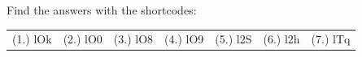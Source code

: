      

    
  \label{m38727**end}
          
       
    
  \label{337cc49099d6e82169c54b5d0fc3878f**end}
    
\par {} Find the answers with the shortcodes:
 \par \begin{tabular}[h]{cccccc}
 (1.) lOk  &  (2.) lO0  &  (3.) lO8  &  (4.) lO9  &  (5.) l2S  &  (6.) l2h  &  (7.) lTq  & \end{tabular}



